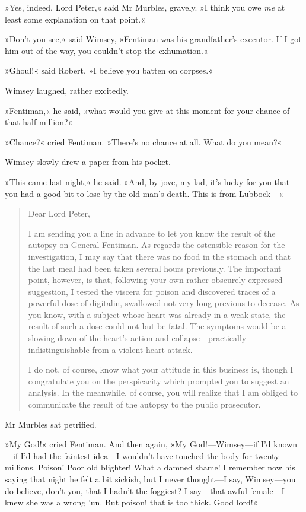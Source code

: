 »Yes, indeed, Lord Peter,« said Mr Murbles, gravely. »I think you owe \textit{me} at least some explanation on that point.«

»Don't you see,« said Wimsey, »Fentiman was his grandfather's executor. If I got him out of the way, you couldn't stop the exhumation.«

»Ghoul!« said Robert. »I believe you batten on corpses.«

Wimsey laughed, rather excitedly.

»Fentiman,« he said, »what would you give at this moment for your chance of that half-million?«

»Chance?« cried Fentiman. »There's no chance at all. What do you mean?«

Wimsey slowly drew a paper from his pocket.

»This came last night,« he said. »And, by jove, my lad, it's lucky for you that you had a good bit to lose by the old man's death. This is from Lubbock—«

\begin{quotation}
\noindent Dear Lord Peter,

\indent I am sending you a line in advance to let you know the result of the autopsy on General Fentiman. As regards the ostensible reason for the investigation, I may say that there was no food in the stomach and that the last meal had been taken several hours previously. The important point, however, is that, following your own rather obscurely-expressed suggestion, I tested the viscera for poison and discovered traces of a powerful dose of digitalin, swallowed not very long previous to decease. As you know, with a subject whose heart was already in a weak state, the result of such a dose could not but be fatal. The symptoms would be a slowing-down of the heart's action and collapse—practically indistinguishable from a violent heart-attack.

I do not, of course, know what your attitude in this business is, though I congratulate you on the perspicacity which prompted you to suggest an analysis. In the meanwhile, of course, you will realize that I am obliged to communicate the result of the autopsy to the public prosecutor.
\end{quotation}

Mr Murbles sat petrified.

»My God!« cried Fentiman. And then again, »My God!—Wimsey—if I'd known—if I'd had the faintest idea—I wouldn't have touched the body for twenty millions. Poison! Poor old blighter! What a damned shame! I remember now his saying that night he felt a bit sickish, but I never thought—I say, Wimsey—you do believe, don't you, that I hadn't the foggiest? I say—that awful female—I knew she was a wrong 'un. But poison! that is too thick. Good lord!«

